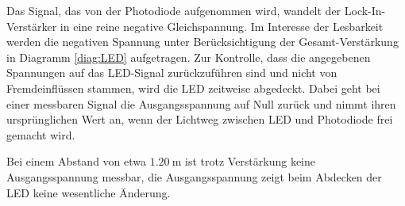 Das Signal, das von der Photodiode aufgenommen wird, wandelt der Lock-In-Verstärker in eine reine negative Gleichspannung.
Im Interesse der Lesbarkeit werden die negativen Spannung unter Berücksichtigung der Gesamt-Verstärkung in Diagramm \ref{diag:LED} aufgetragen.
Zur Kontrolle, dass die angegebenen Spannungen auf das LED-Signal zurückzuführen sind und nicht von Fremdeinflüssen stammen, wird die LED zeitweise abgedeckt.
Dabei geht bei einer messbaren Signal die Ausgangsspannung auf Null zurück und nimmt ihren ursprünglichen Wert an, wenn der Lichtweg zwischen LED und Photodiode frei gemacht wird.

Bei einem Abstand von etwa $\SI{1.20}{\meter}$ ist trotz Verstärkung keine Ausgangsspannung messbar, 
die Ausgangsspannung zeigt beim Abdecken der LED keine wesentliche Änderung.

